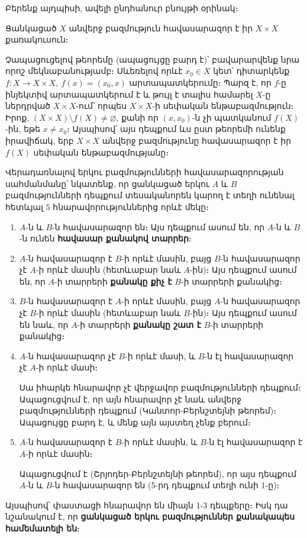\documentclass[./main.tex]{subfiles}
\begin{document}
\par Բերենք այդպիսի, ավելի ընդհանուր բնույթի օրինակ։

\begin{ntheorem}\label{ch3thm_x}
Ցանկացած $X$ անվերջ բազմություն հավասարազոր է իր $X \times X$ քա\-ռա\-կու\-սուն։
\end{ntheorem}

\par Չապացուցելով թեորեմը (ապացույցը բարդ է)՝ բավարարվենք նրա որոշ մեկնա\-բանությամբ։ Սևեռե\-լով որևէ $x_0 \in X$ կետ՝ դիտարկենք $f:X \rightarrow X\times X,\ f(x)=(x_0,x)$ արտապատկերումը։ Պարզ է, որ $f$-ը ինյեկտիվ արտապատկերում է և թույլ է տալիս համարել $X$-ը ներդրված $X\times X$-ում՝ որպես $X\times X$-ի սեփական ենթաբազմու\-թյուն։ Իրոք, $(X\times X) \setminus  f(X) \neq \varnothing$, քանի որ $(x, x_0)$-ն չի պատկանում $f(X)$-ին, եթե $x\neq x_0$։ Այսպիսով՝ այս դեպքում ևս ըստ թեորեմի ունենք իրավիճակ, երբ $X\times X$ անվերջ բազմությունը հավասարազոր է իր $f(X)$ սեփական ենթաբազմությանը։
\par Վերադառնալով երկու բազմությունների հավասարազորության սահմանմանը՝ նկատենք, որ ցանկացած երկու $A$ և $B$ բազմությունների դեպքում տեսականորեն կարող է տեղի ունենալ հետևյալ $5$ հնարավորություններից որևէ մեկը։
\begin{enumerate}
    \item $A$-ն և $B$-ն հավասարազոր են։ Այս դեպքում ասում են, որ $A$-ն և $B$-ն ունեն \textbf{հավասար քանակով տարրեր}։
    \item $A$-ն հավասարազոր է $B$-ի որևէ մասին, բայց $B$-ն հավասարազոր չէ $A$-ի որևէ մասին (հետևաբար նաև $A$-ին)։ Այս դեպքում ասում են, որ $A$-ի տարրերի \textbf{քանակը քիչ է} $B$-ի տարրերի քանակից։
    \item $B$-ն հավասարազոր է $A$-ի որևէ մասին, բայց $A$-ն հավասարազոր չէ $B$-ի որևէ մասին (հետևաբար նաև $B$-ին)։ Այս դեպքում ասում են նաև, որ $A$-ի տարրերի \textbf{քանակը շատ է} $B$-ի տարրերի քանակից։
    \item $A$-ն հավասարազոր չէ $B$-ի որևէ մասի, և $B$-ն էլ հավասարազոր չէ $A$-ի որևէ մասի։
    \par Սա իհարկե հնարավոր չէ վերջավոր բազմությունների դեպքում։ Ապա\-ցուց\-վում է, որ այն հնարավոր չէ նաև անվերջ բազմությունների դեպքում (Կան\-տոր-Բերնշտեյնի թեորեմ)։ Ապացույցը բարդ է, և մենք այն այստեղ չենք բերում։
    \item $A$-ն հավասարազոր է $B$-ի որևէ մասին, և $B$-ն էլ հավասարազոր է $A$-ի որևէ մասին։
    \par Ապացուցվում է (Շրյոդեր-Բերնշտեյնի թեորեմ), որ այս դեպքում $A$-ն և $B$-ն հավասարազոր են (5-րդ դեպքում տեղի ունի 1-ը)։
\end{enumerate}
\par Այսպիսով՝ փաստացի հնարավոր են միայն 1-3 դեպքերը։ Իսկ դա նշանակում է, որ \textbf{ցանկացած երկու բազմություններ քանակապես համեմատելի են}։
\end{document}
